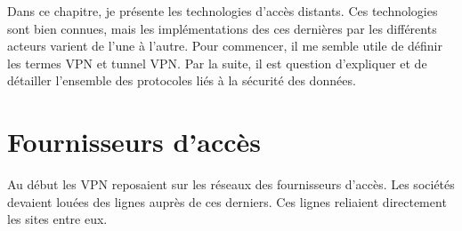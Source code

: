 Dans ce chapitre, je présente les technologies d'accès distants.
Ces technologies sont bien connues, mais les implémentations des ces dernières par les différents acteurs varient de l'une à l'autre.
Pour commencer, il me semble utile de définir les termes VPN et tunnel VPN.
Par la suite, il est question d'expliquer et de détailler l'ensemble des protocoles liés à la sécurité des données.











\section{Fournisseurs d'accès}
Au début les VPN reposaient sur les réseaux des fournisseurs d'accès.
Les sociétés devaient louées des lignes auprès de ces derniers. 
Ces lignes reliaient directement les sites entre eux.



